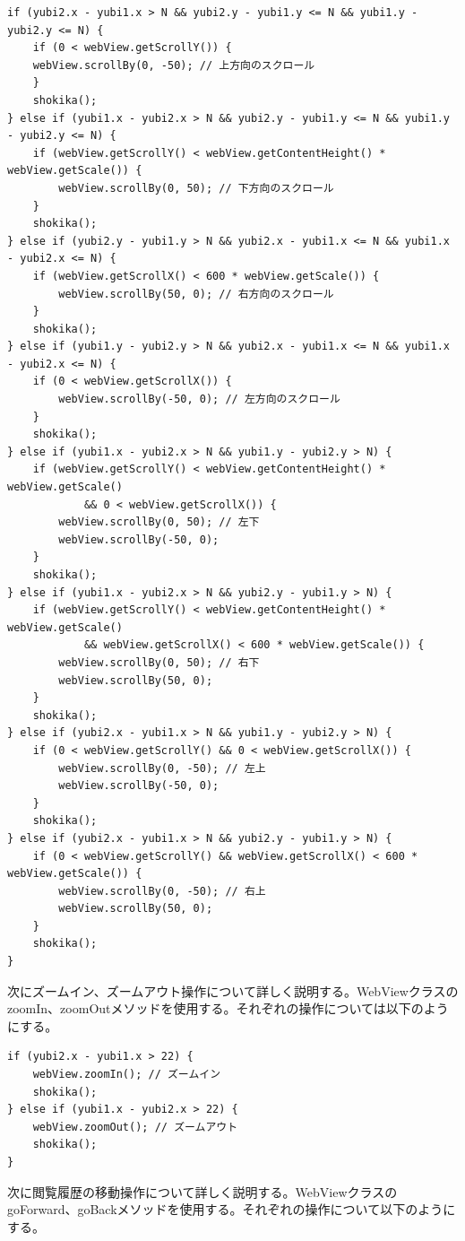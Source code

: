 \documentclass[11pt,a4j, titlepage]{jarticle} %
\begin{document}
\begin{lstlisting}[basicstyle=\ttfamily\footnotesize, frame=single]
if (yubi2.x - yubi1.x > N && yubi2.y - yubi1.y <= N && yubi1.y - yubi2.y <= N) {
	if (0 < webView.getScrollY()) {
	webView.scrollBy(0, -50); // 上方向のスクロール
	}
	shokika();
} else if (yubi1.x - yubi2.x > N && yubi2.y - yubi1.y <= N && yubi1.y - yubi2.y <= N) {
	if (webView.getScrollY() < webView.getContentHeight() * webView.getScale()) {
		webView.scrollBy(0, 50); // 下方向のスクロール
	}
	shokika();
} else if (yubi2.y - yubi1.y > N && yubi2.x - yubi1.x <= N && yubi1.x - yubi2.x <= N) {
	if (webView.getScrollX() < 600 * webView.getScale()) {
		webView.scrollBy(50, 0); // 右方向のスクロール
	}
	shokika();
} else if (yubi1.y - yubi2.y > N && yubi2.x - yubi1.x <= N && yubi1.x - yubi2.x <= N) {
	if (0 < webView.getScrollX()) {
		webView.scrollBy(-50, 0); // 左方向のスクロール
	}
	shokika();
} else if (yubi1.x - yubi2.x > N && yubi1.y - yubi2.y > N) {
	if (webView.getScrollY() < webView.getContentHeight() * webView.getScale()
			&& 0 < webView.getScrollX()) {
		webView.scrollBy(0, 50); // 左下
		webView.scrollBy(-50, 0);
	}
	shokika();
} else if (yubi1.x - yubi2.x > N && yubi2.y - yubi1.y > N) {
	if (webView.getScrollY() < webView.getContentHeight() * webView.getScale()
			&& webView.getScrollX() < 600 * webView.getScale()) {
		webView.scrollBy(0, 50); // 右下
		webView.scrollBy(50, 0);
	}
	shokika();
} else if (yubi2.x - yubi1.x > N && yubi1.y - yubi2.y > N) {
	if (0 < webView.getScrollY() && 0 < webView.getScrollX()) {
		webView.scrollBy(0, -50); // 左上
		webView.scrollBy(-50, 0);
	}
	shokika();
} else if (yubi2.x - yubi1.x > N && yubi2.y - yubi1.y > N) {
	if (0 < webView.getScrollY() && webView.getScrollX() < 600 * webView.getScale()) {
		webView.scrollBy(0, -50); // 右上
		webView.scrollBy(50, 0);
	}
	shokika();
}
\end{lstlisting}

次にズームイン、ズームアウト操作について詳しく説明する。WebViewクラスのzoomIn、zoomOutメソッドを使用する。それぞれの操作については以下のようにする。

\begin{lstlisting}[basicstyle=\ttfamily\footnotesize, frame=single]
if (yubi2.x - yubi1.x > 22) {
	webView.zoomIn(); // ズームイン
	shokika();
} else if (yubi1.x - yubi2.x > 22) {
	webView.zoomOut(); // ズームアウト
	shokika();
}
\end{lstlisting}

次に閲覧履歴の移動操作について詳しく説明する。WebViewクラスのgoForward、goBackメソッドを使用する。それぞれの操作について以下のようにする。
\end{document}
